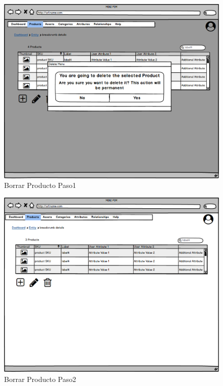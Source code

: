 \begin{figure}[H]
    \includegraphics[width=1\linewidth]{mockups/RF2-X Borrar Producto (Borrar Producto Paso1).png}
    \caption{Borrar Producto Paso1}
   \end{figure}
\vspace{1.0cm}

\begin{figure}[H]
    \includegraphics[width=1\linewidth]{mockups/RF2-X Borrar Producto (Borrar Producto Paso2).png}
    \caption{Borrar Producto Paso2}
   \end{figure}
\vspace{1.0cm}

\newpage %